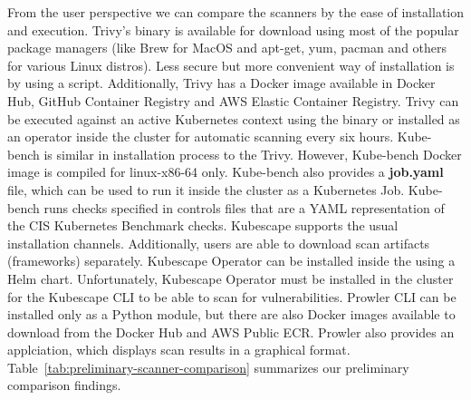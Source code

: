 From the user perspective we can compare the scanners by the ease of installation and execution. Trivy's binary is available for download using most of the popular package managers (like Brew for MacOS and apt-get, yum, pacman and others for various Linux distros). Less secure but more convenient way of installation is by using a script. Additionally, Trivy has a Docker image available in Docker Hub, GitHub Container Registry and AWS Elastic Container Registry. Trivy can be executed against an active Kubernetes context using the binary or installed as an operator inside the cluster for automatic scanning every six hours. Kube-bench is similar in installation process to the Trivy. However, Kube-bench Docker image is compiled for linux-x86-64 only. Kube-bench also provides a \textbf{job.yaml} file, which can be used to run it inside the cluster as a Kubernetes Job. Kube-bench runs checks specified in controls files that are a YAML representation of the CIS Kubernetes Benchmark checks. Kubescape supports the usual installation channels. Additionally, users are able to download scan artifacts (frameworks) separately. Kubescape Operator can be installed inside the using a Helm chart. Unfortunately, Kubescape Operator must be installed in the cluster for the Kubescape CLI to be able to scan for vulnerabilities. Prowler CLI can be installed only as a Python module, but there are also Docker images available to download from the Docker Hub and AWS Public ECR. Prowler also provides an applciation, which displays scan results in a graphical format. Table~\ref{tab:preliminary-scanner-comparison} summarizes our preliminary comparison findings.

